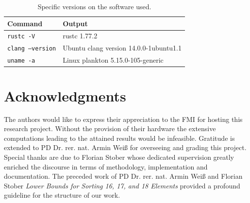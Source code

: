 \documentclass[10pt,journal,compsoc]{IEEEtran}
\begin{document}
\begin{table}[!t]
  \renewcommand{\arraystretch}{1.2}
  \caption{Specific versions on the software used.}
  \label{table:command_outputs}
  \centering
  \begin{tabular}{l|l}
    \textbf{Command}         & \textbf{Output}                        \\ \hline
    \texttt{rustc -V}        & rustc 1.77.2                           \\ \hline
    \texttt{clang --version} & Ubuntu clang version 14.0.0-1ubuntu1.1 \\ \hline
    \texttt{uname -a}        & Linux plankton 5.15.0-105-generic      \\
  \end{tabular}
\end{table}


\section*{Acknowledgments}

The authors would like to express their appreciation to the FMI for hosting this
research project. Without the provision of their hardware the extensive
computations leading to the attained results would be infeasible. Gratitude is
extended to PD Dr. rer. nat. Armin Weiß for overseeing and grading this project. Special thanks
are due to Florian Stober whose dedicated supervision greatly enriched the
discourse in terms of methodology, implementation and documentation. The
preceded work of PD Dr. rer. nat. Armin Weiß and Florian Stober \textit{Lower Bounds for Sorting
  16, 17, and 18 Elements} \cite{stober2022lower} provided a profound guideline
for the structure of our work.

\ifCLASSOPTIONcaptionsoff
  \newpage
\fi




\end{document}
